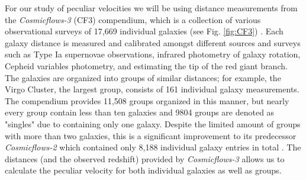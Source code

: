 For our study of peculiar velocities we will be using distance measurements from the \textit{Cosmicflows-3} (CF3) compendium, which is a collection of various observational surveys of 17,669 individual galaxies (see Fig. \ref{fig:CF3}) \cite{Tully2016:cf3}. Each galaxy distance is measured and calibrated amongst different sources and surveys such as Type Ia supernovae observations, infrared photometry of galaxy rotation,  Cepheid variables photometry, and estimating the tip of the red giant branch. The galaxies are organized into groups of similar distances; for example, the Virgo Cluster, the largest group, consists of 161 individual galaxy measurements. The compendium provides 11,508 groups organized in this manner, but nearly every group contain less than ten galaxies and 9804 groups are denoted as "singles" due to containing only one galaxy. Despite the limited amount of groups with more than two galaxies, this is a significant improvement to its predecessor \textit{Cosmicflows-2} which contained only 8,188 individual galaxy entries in total \cite{Tully2013:cf2}. The distances (and the observed redshift) provided by \textit{Cosmicflows-3} allows us to calculate the peculiar velocity for both individual galaxies as well as groups.
